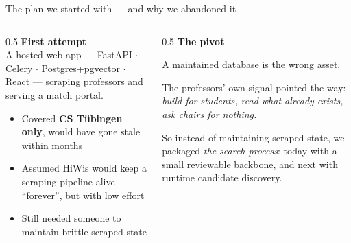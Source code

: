 \documentclass[11pt,aspectratio=169]{beamer}
\begin{document}
\begin{frame}{The plan we started with --- and why we abandoned it}
  \begin{columns}[T]
    \begin{column}{0.5\textwidth}
      \textbf{First attempt}\\[0.3em]
      A hosted web app --- FastAPI $\cdot$ Celery $\cdot$ Postgres+pgvector
      $\cdot$ React --- scraping professors and serving a match portal.
      \smallskip
      \begin{itemize}
        \item Covered \textbf{CS Tübingen only}, would have gone stale within months
        \item Assumed HiWis would keep a scraping pipeline alive ``forever'', but with low effort
        \item Still needed someone to maintain brittle scraped state
      \end{itemize}
    \end{column}
    \begin{column}{0.5\textwidth}
      \textbf{The pivot}\\[0.3em]
      \begin{center}
        \alert{\large A maintained database is the wrong asset.}
      \end{center}
      \smallskip
      The professors' own signal pointed the way: \emph{build for students,
      read what already exists, ask chairs for nothing.}
      \smallskip

      So instead of maintaining scraped state, we packaged \emph{the search process}:
      today with a small reviewable backbone, and next with runtime candidate discovery.
    \end{column}
  \end{columns}
\end{frame}
\end{document}
